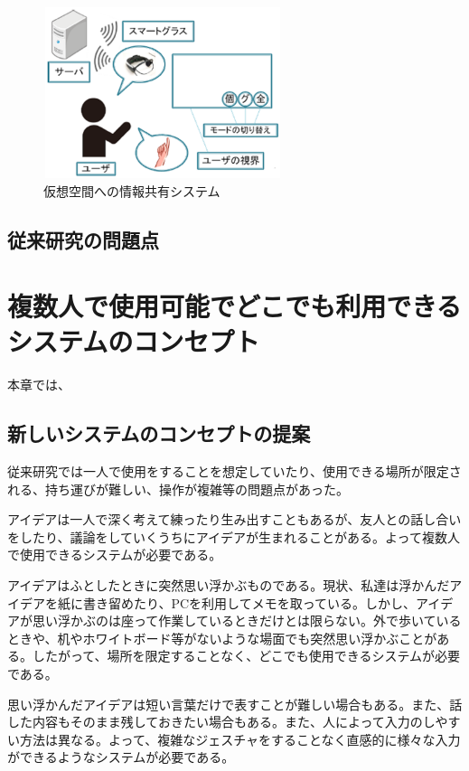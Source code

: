 \documentclass[11pt,a4j, titlepage]{jarticle} %
\begin{document}
\begin{figure}[H]
  \begin{center}
    \includegraphics[clip,height=5.0cm,width=7.0cm]{./kasoukuukan.eps}
    \caption{仮想空間への情報共有システム}
    \label{fig:kasoukuukan}
  \end{center}
\end{figure}

\subsection{従来研究の問題点}

\newpage
\section{複数人で使用可能でどこでも利用できるシステムのコンセプト}
本章では、

\subsection{新しいシステムのコンセプトの提案} \label{concept}
従来研究では一人で使用をすることを想定していたり、使用できる場所が限定される、持ち運びが難しい、操作が複雑等の問題点があった。

アイデアは一人で深く考えて練ったり生み出すこともあるが、友人との話し合いをしたり、議論をしていくうちにアイデアが生まれることがある。よって複数人で使用できるシステムが必要である。

アイデアはふとしたときに突然思い浮かぶものである。現状、私達は浮かんだアイデアを紙に書き留めたり、PCを利用してメモを取っている。しかし、アイデアが思い浮かぶのは座って作業しているときだけとは限らない。外で歩いているときや、机やホワイトボード等がないような場面でも突然思い浮かぶことがある。したがって、場所を限定することなく、どこでも使用できるシステムが必要である。

思い浮かんだアイデアは短い言葉だけで表すことが難しい場合もある。また、話した内容もそのまま残しておきたい場合もある。また、人によって入力のしやすい方法は異なる。よって、複雑なジェスチャをすることなく直感的に様々な入力ができるようなシステムが必要である。
\end{document}
